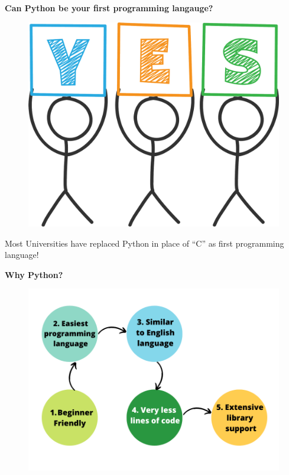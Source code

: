 
\begin{flushleft}
	
	\bigskip
	
	\textbf{Can Python be your first programming langauge?}
	
	\begin{figure}[h!]
		\centering
		\includegraphics[scale=.2]{content/chapter0/images/yes.png}
		\label{fig:1}
	\end{figure}
	Most Universities have replaced Python in place of “C” as first programming language!
	
	\bigskip
	\bigskip
	
	\textbf{Why Python?}
	\begin{figure}[h!]
		\centering
		\includegraphics[scale=.55]{content/chapter0/images/list.png}
		\label{fig:1}
	\end{figure}

	
	
\end{flushleft}

\newpage

